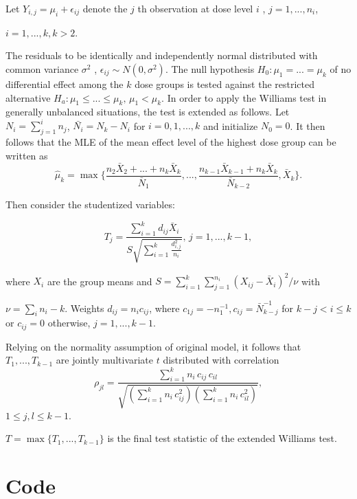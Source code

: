 \documentclass[14pt]{extarticle}
\begin{document}
Let $Y_{i,j} = \mu_i + \epsilon_{ij}$ denote the $j$ th observation at dose level $i$ ,  $j =1, . . . , n_i $,  

$ i =1, . . . , k, k>2$.


The residuals to be identically and independently normal distributed
with common variance $\sigma^2$ , $ \epsilon_{ij}  \sim N(0, \sigma^2)$.  The null hypothesis  $H_0: \mu_1 = ... = \mu_k$ of no differential effect among the $k$ dose groups is tested against the restricted alternative $H_a :  \mu_1 \leq ... \leq \mu_k, \, \mu_1 < \mu_k$. In order to apply the Williams test in generally unbalanced situations,  the test is extended as follows. Let $N_i = \sum_{j=1}^i n_j$, $\bar{N_i} =   N_k - N_i$ for $i=0, 1, . . . , k$ and initialize $N_0 = 0$. It then follows that the MLE of the mean effect level of the highest dose group can be written as 
$$  \hat{\mu}_k  =  \max    \lbrace   \frac{n_2 \bar{X}_2 + ...  + n_k \bar{X}_k }{ \bar{N}_1}, ... ,     \frac{n_{k-1} \bar{X}_{k-1} + n_k \bar{X}_k }{ \bar{N}_{k-2}}, \bar{X}_k \rbrace .$$

Then consider the studentized variables:


$$  T_j = \frac{\sum_{i=1}^k d_{ij} \bar{X}_i  }{S \sqrt{\sum_{i=1}^k  \frac{d_{i,j}^2}{n_i}   }} , \,  j= 1, . . . , k - 1,$$


where $X_i$ are the group means and $S = \sum_{i = 1}^k  \sum_{j=1}^{n_i} (X_{ij}  -  \bar{X}_i)^2 / \nu$ with 


$\nu = \sum_i n_i - k$. Weights $d_{ij} = n_i c_{ij}$, where $c_{1j} = -n_1^{-1}, c_{ij} = \bar{N}_{k-j}^{-1}$ for $k - j < i \leq k$ or $c_{ij} = 0$ otherwise, $ j= 1, . . . , k - 1$.

Relying on the normality assumption of original model, it follows that $ T_1, . . . , T_{k -1}$ are jointly multivariate $t$ distributed with correlation  $$ \rho_{jl}  =  \frac{\sum_{i=1}^k n_i \, c_{ij} \, c_{il}}{\sqrt{(\sum_{i=1}^k n_i \, c_{ij}^2 ) (\sum_{i=1}^k n_i \, c_{il}^2 )}},$$  $1  \leq   j, l  \leq  k-1$.

$T = \max  \lbrace  T_1,  ..., T_{k-1}  \rbrace$ is the final test statistic of the extended Williams test.

\section*{Code}
\end{document}
